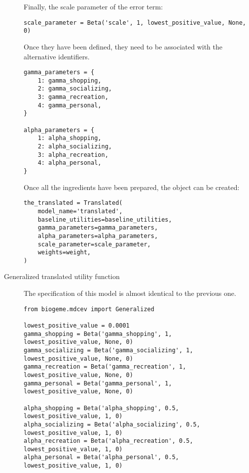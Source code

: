 \documentclass[12pt,a4paper]{article}
\begin{document}
\begin{description}
\begin{center}
\begin{lstlisting}
         \end{lstlisting}
     \end{center}
    Finally, the scale parameter of the error term:
\begin{center}
         \begin{lstlisting}
scale_parameter = Beta('scale', 1, lowest_positive_value, None, 0)
         \end{lstlisting}
     \end{center}
    Once they have been defined, they need to be associated with the alternative identifiers.
    \begin{center}
         \begin{lstlisting}
gamma_parameters = {
    1: gamma_shopping,
    2: gamma_socializing,
    3: gamma_recreation,
    4: gamma_personal,
}

alpha_parameters = {
    1: alpha_shopping,
    2: alpha_socializing,
    3: alpha_recreation,
    4: alpha_personal,
}
         \end{lstlisting}
     \end{center}
    Once all the ingredients have been prepared, the object can be created:
    \begin{center}
         \begin{lstlisting}
the_translated = Translated(
    model_name='translated',
    baseline_utilities=baseline_utilities,
    gamma_parameters=gamma_parameters,
    alpha_parameters=alpha_parameters,
    scale_parameter=scale_parameter,
    weights=weight,
)
         \end{lstlisting}
     \end{center}
    \item[Generalized translated utility function] The specification of this model is almost identical to the previous one.
    \begin{center}
         \begin{lstlisting}
from biogeme.mdcev import Generalized

lowest_positive_value = 0.0001
gamma_shopping = Beta('gamma_shopping', 1, lowest_positive_value, None, 0)
gamma_socializing = Beta('gamma_socializing', 1, lowest_positive_value, None, 0)
gamma_recreation = Beta('gamma_recreation', 1, lowest_positive_value, None, 0)
gamma_personal = Beta('gamma_personal', 1, lowest_positive_value, None, 0)

alpha_shopping = Beta('alpha_shopping', 0.5, lowest_positive_value, 1, 0)
alpha_socializing = Beta('alpha_socializing', 0.5, lowest_positive_value, 1, 0)
alpha_recreation = Beta('alpha_recreation', 0.5, lowest_positive_value, 1, 0)
alpha_personal = Beta('alpha_personal', 0.5, lowest_positive_value, 1, 0)


\end{lstlisting}
\end{center}
\end{description}
\end{document}
